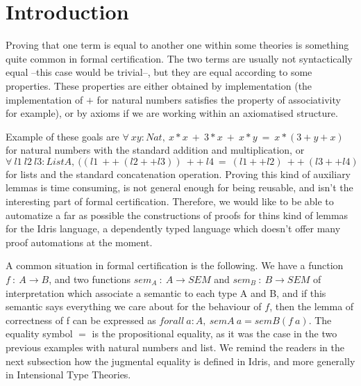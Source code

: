 \section{Introduction}

Proving that one term is equal to another one within some theories is something quite common in formal certification. The two terms are usually not syntactically equal --this case would be trivial--, but they are equal according to some properties. These properties are either obtained by implementation (the implementation of $+$ for natural numbers satisfies the property of associativity for example), or by axioms if we are working within an axiomatised structure. 

Example of these goals are $\forall\ xy:Nat,\ x*x\ +\ 3*x\ +\ x*y\ =\ x*(3+y+x)$ for natural numbers with the standard addition and multiplication, or $\forall\ l1\ l2\ l3:List A,\ ((l1\ ++\ (l2 ++ l3))\ ++\ l4\ =\ (l1++l2)\ ++\ (l3++l4)$ for lists and the standard concatenation operation. Proving this kind of auxiliary lemmas is time consuming, is not general enough for being reusable, and isn't the interesting part of formal certification. Therefore, we would like to be able to automatize a far as possible the constructions of proofs for thins kind of lemmas for the Idris language, a dependently typed language which doesn't offer many proof automations at the moment.

A common situation in formal certification is the following. We have a function $f\ :\ A \rightarrow B$, and two functions $sem_A\ :\ A \rightarrow SEM$ and $sem_B\ : \ B \rightarrow SEM$ of interpretation which associate a semantic to each type A and B, and if this semantic says everything we care about for the behaviour of $f$, then the lemma of correctness of f can be expressed as $forall\ a:A,\ semA\ a = semB (f\ a)$.
The equality symbol $=$ is the propositional equality, as it was the case in the two previous examples with natural numbers and list. We remind the readers in the next subsection how the jugmental equality is defined in Idris, and more generally in Intensional Type Theories.


